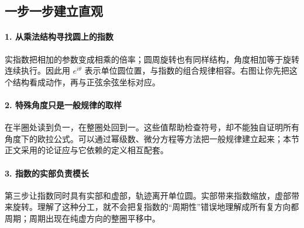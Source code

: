 \subsection*{一步一步建立直观}

\paragraph{1. 从乘法结构寻找圆上的指数}

实指数把相加的参数变成相乘的倍率；圆周旋转也有同样结构，角度相加等于旋转连续执行。因此用 $e^{i\theta}$ 表示单位圆位置，与指数的组合规律相容。右图让你先把这个结构看成动作，再与正弦余弦坐标对应。



\paragraph{2. 特殊角度只是一般规律的取样}

在半圈处读到负一，在整圈处回到一。这些值帮助检查符号，却不能独自证明所有角度下的欧拉公式。可以通过幂级数、微分方程等方法把一般规律建立起来；本节正文采用的论证应与它依赖的定义相互配套。



\paragraph{3. 指数的实部负责模长}

第三步让指数同时具有实部和虚部，轨迹离开单位圆。实部带来指数缩放，虚部带来旋转。理解了这种分工，就不会把复指数的“周期性”错误地理解成所有复方向都周期；周期出现在纯虚方向的整圈平移中。
